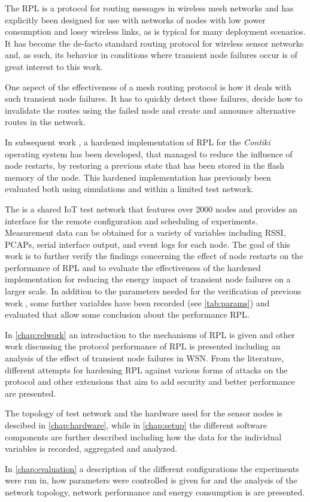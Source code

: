 The \ac{RPL} is a protocol for routing messages in wireless mesh networks
and has explicitly been designed for use with networks of nodes with low power
consumption and lossy wireless links, as is typical for many deployment
scenarios. It has become the de-facto standard routing protocol for wireless
sensor networks and, as such, its behavior in conditions where transient node
failures occur is of great interest to this work.

One aspect of the effectiveness of a mesh routing protocol is how it deals with
such transient node failures. It has to quickly detect these failures, decide
how to invalidate the routes using the failed node and create and announce
alternative routes in the network.

In subsequent work \cite{mueller2017}, a hardened implementation of \ac{RPL} for
the \emph{Contiki} operating system has been developed, that managed to reduce
the influence of node restarts, by restoring a previous state that has been
stored in the flash memory of the node. This hardened implementation has
previously been evaluated both using simulations and within a limited test
network.

The \fitlab is a shared \ac{IoT} test network that features over 2000 nodes and
provides an interface for the remote configuration and scheduling of
experiments. Measurement data can be obtained for a variety of variables including
\ac{RSSI}, \acp{PCAP}, serial interface output, and event logs for each node.
The goal of this work is to further verify the findings concerning the effect of
node restarts on the performance of \ac{RPL} and to evaluate the effectiveness
of the hardened implementation for reducing the energy impact of transient node
failures on a larger scale. In addition to the parameters needed for the
verification of previous work \cite{mueller2017}, some further variables have
been recorded (see \autoref{tab:params}) and evaluated that allow some
conclusion about the performance \ac{RPL}.

In \autoref{chap:relwork} an introduction to the mechanisms of \ac{RPL} is given
and other work discussing the protocol performance of \ac{RPL} is presented
including an analysis of the effect of transient node failures in \ac{WSN}. From
the literature, different attempts for hardening \ac{RPL} against various forms
of attacks on the protocol and other extensions that aim to add security and
better performance are presented.

The topology of test network and the hardware used for the sensor nodes is
descibed in \autoref{chap:hardware}, while in \autoref{chap:setup} the different
software components are further described including how the data for the
individual variables is recorded, aggregated and analyzed.

In \autoref{chap:evaluation} a description of the different configurations the
experiments were run in, how parameters were controlled is given for and the
analysis of the network topology, network performance and energy consumption is
are presented.